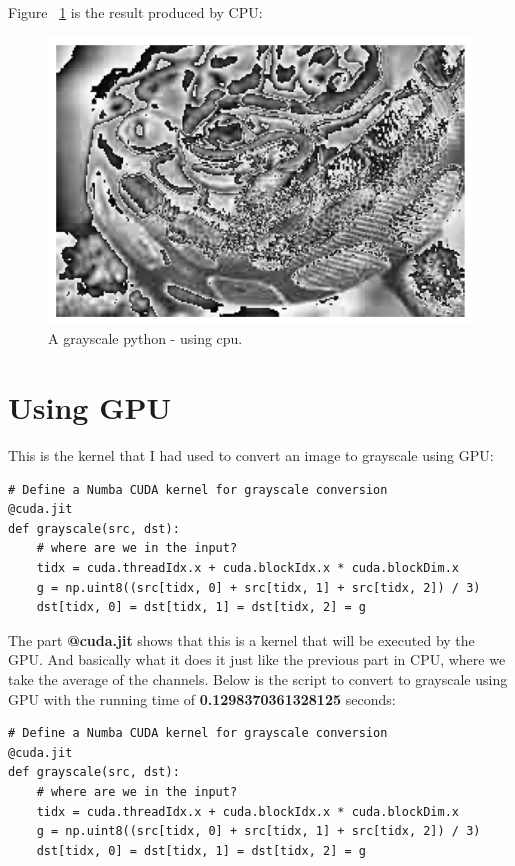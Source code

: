 \documentclass{article}
\begin{document}
Figure ~\ref{fig:cpu_python} is the result produced by CPU:

\begin{figure}
  \includegraphics[width=\linewidth]{cpu_python.png}
  \caption{A grayscale python - using cpu.}
  \label{fig:cpu_python}
\end{figure}


\section{Using GPU}
This is the kernel that I had used to convert an image to grayscale using GPU:
\begin{verbatim}
# Define a Numba CUDA kernel for grayscale conversion
@cuda.jit
def grayscale(src, dst):
    # where are we in the input?
    tidx = cuda.threadIdx.x + cuda.blockIdx.x * cuda.blockDim.x
    g = np.uint8((src[tidx, 0] + src[tidx, 1] + src[tidx, 2]) / 3)
    dst[tidx, 0] = dst[tidx, 1] = dst[tidx, 2] = g
\end{verbatim}
The part \textbf{@cuda.jit} shows that this is a kernel that will be executed by the GPU. And basically what it does it just like the previous part in CPU, where we take the average of the channels. Below is the script to convert to grayscale using GPU with the running time of \textbf{0.1298370361328125} seconds:

\begin{verbatim}
# Define a Numba CUDA kernel for grayscale conversion
@cuda.jit
def grayscale(src, dst):
    # where are we in the input?
    tidx = cuda.threadIdx.x + cuda.blockIdx.x * cuda.blockDim.x
    g = np.uint8((src[tidx, 0] + src[tidx, 1] + src[tidx, 2]) / 3)
    dst[tidx, 0] = dst[tidx, 1] = dst[tidx, 2] = g
\end{verbatim}
\end{document}
